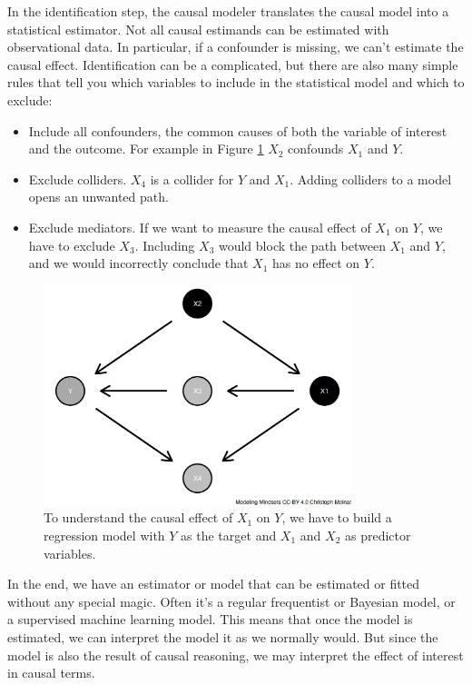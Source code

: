 \documentclass[
  10pt,
]{scrbook}
\providecommand{\tightlist}{%
  \setlength{\itemsep}{0pt}\setlength{\parskip}{0pt}}
\begin{document}
In the identification step, the causal modeler translates the causal model into a statistical estimator.
Not all causal estimands can be estimated with observational data.
In particular, if a confounder is missing, we can't estimate the causal effect.
Identification can be a complicated, but there are also many simple rules that tell you which variables to include in the statistical model and which to exclude:

\begin{itemize}
\tightlist
\item
  Include all confounders, the common causes of both the variable of interest and the outcome. For example in Figure \ref{fig:dag-rules} \(X_2\) confounds \(X_1\) and \(Y\).
\item
  Exclude colliders. \(X_4\) is a collider for \(Y\) and \(X_1\). Adding colliders to a model opens an unwanted path.
\item
  Exclude mediators. If we want to measure the causal effect of \(X_1\) on \(Y\), we have to exclude \(X_3\). Including \(X_3\) would block the path between \(X_1\) and \(Y\), and we would incorrectly conclude that \(X_1\) has no effect on \(Y\).
\end{itemize}

\begin{figure}

{\centering \includegraphics[width=0.8\textwidth]{figures/dag-rules-1} 

}

\caption{To understand the causal effect of $X_1$ on $Y$, we have to build a regression model with $Y$ as the target and $X_1$ and $X_2$ as predictor variables.}\label{fig:dag-rules}
\end{figure}

In the end, we have an estimator or model that can be estimated or fitted without any special magic.
Often it's a regular frequentist or Bayesian model, or a supervised machine learning model.
This means that once the model is estimated, we can interpret the model it as we normally would.
But since the model is also the result of causal reasoning, we may interpret the effect of interest in causal terms.
\end{document}
